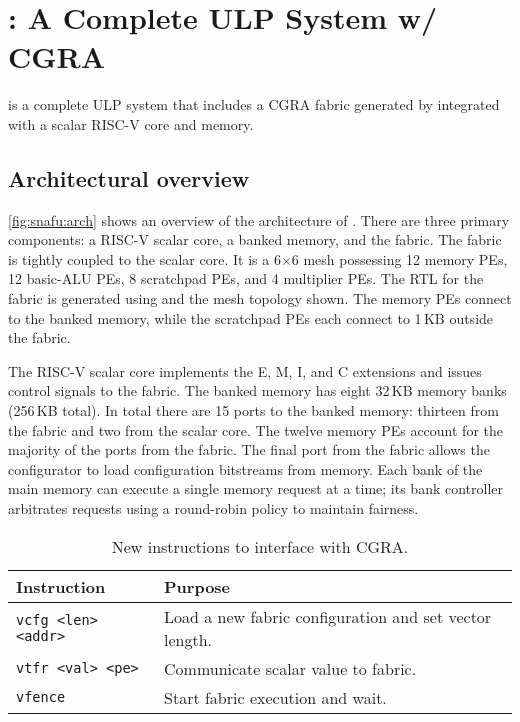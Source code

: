 \section{\snafuarch: A Complete ULP System w/ CGRA}
\label{snafu:arch}
 
\snafuarch is a complete ULP system that includes a CGRA fabric generated by \snafuframe
integrated with a scalar RISC-V core and memory.

\figSNAFUArch

\subsection{Architectural overview}
\autoref{fig:snafu:arch} shows an overview of the architecture of \snafuarch.
% 
There are three primary components: a \mbox{RISC-V} scalar core, a banked memory, and the \snafuframe fabric.
% 
The \snafu fabric is tightly coupled to the scalar core.
% 
It is a 6$\times$6 mesh possessing 12 memory PEs, 12 basic-ALU PEs, 8 scratchpad PEs, and 4 multiplier PEs.
% 
The RTL for the fabric is generated using \snafuframe and the mesh topology shown.
%
The memory PEs connect to the banked memory, while the scratchpad PEs each connect to 1\,KB outside the fabric.

The RISC-V scalar core implements the E, M, I, and C extensions and issues control signals to the \snafuframe fabric.
% 
The banked memory has eight 32\,KB memory banks (256\,KB total). 
% 
In total there are 15 ports to the banked memory: thirteen from the \snafuframe fabric and two from the scalar core.
% 
The twelve memory PEs account for the majority of the ports from the fabric.
% 
The final port from the fabric allows the \snafuframe configurator to load configuration bitstreams from memory.
% 
Each bank of the main memory can execute a single memory request at a time; its bank controller arbitrates requests using a round-robin policy to maintain fairness.

\begin{table}[b]
  \centering
  \footnotesize
  \begin{tabular}{lp{1.85in}}
    \toprule
    \bf Instruction & \bf Purpose \\
    \midrule
    {\tt vcfg <len> <addr>} & Load a new fabric configuration and set vector length. \\
    {\tt vtfr <val> <pe>} & Communicate scalar value to fabric. \\
    {\tt vfence} & Start fabric execution and wait. \\
    \bottomrule
  \end{tabular}
  \caption{New instructions to interface with CGRA.}
  \label{tab:snafu:extensions}
\end{table}
